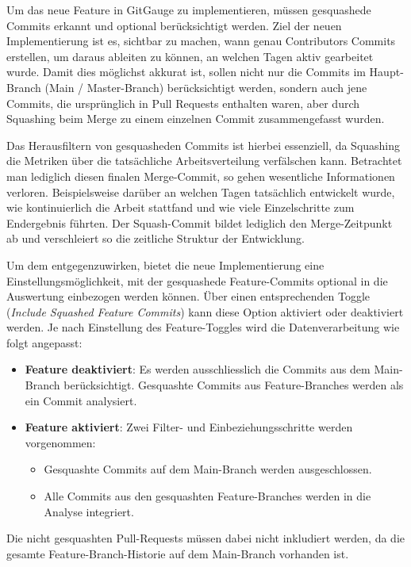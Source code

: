 Um das neue Feature in GitGauge zu implementieren, müssen gesquashede Commits erkannt und optional berücksichtigt werden. Ziel der neuen Implementierung ist es, sichtbar zu machen, wann genau Contributors Commits erstellen, um daraus ableiten zu können, an welchen Tagen aktiv gearbeitet wurde. Damit dies möglichst akkurat ist, sollen nicht nur die Commits im Haupt-Branch (Main / Master-Branch) berücksichtigt werden, sondern auch jene Commits, die ursprünglich in Pull Requests enthalten waren, aber durch Squashing beim Merge zu einem einzelnen Commit zusammengefasst wurden.

Das Herausfiltern von gesquasheden Commits ist hierbei essenziell, da Squashing die Metriken über die tatsächliche Arbeitsverteilung verfälschen kann. Betrachtet man lediglich diesen finalen Merge-Commit, so gehen wesentliche Informationen verloren. Beispielsweise darüber an welchen Tagen tatsächlich entwickelt wurde, wie kontinuierlich die Arbeit stattfand und wie viele Einzelschritte zum Endergebnis führten. Der Squash-Commit bildet lediglich den Merge-Zeitpunkt ab und verschleiert so die zeitliche Struktur der Entwicklung. 

Um dem entgegenzuwirken, bietet die neue Implementierung eine Einstellungsmöglichkeit, mit der gesquashede Feature-Commits optional in die Auswertung einbezogen werden können. Über einen entsprechenden Toggle (\textit{Include Squashed Feature Commits}) kann diese Option aktiviert oder deaktiviert werden. Je nach Einstellung des Feature-Toggles wird die Datenverarbeitung wie folgt angepasst:
\begin{itemize}
    \item \textbf{Feature deaktiviert}: Es werden ausschliesslich die Commits aus dem Main-Branch berücksichtigt. Gesquashte Commits aus Feature-Branches werden als ein Commit analysiert.
    \item \textbf{Feature aktiviert}: Zwei Filter- und Einbeziehungsschritte werden vorgenommen:
        \begin{itemize}
        \item Gesquashte Commits auf dem Main-Branch werden ausgeschlossen.
        \item Alle Commits aus den gesquashten Feature-Branches werden in die Analyse integriert.
    \end{itemize}
\end{itemize}

Die nicht gesquashten Pull-Requests müssen dabei nicht inkludiert werden, da die gesamte Feature-Branch-Historie auf dem Main-Branch vorhanden ist. 

